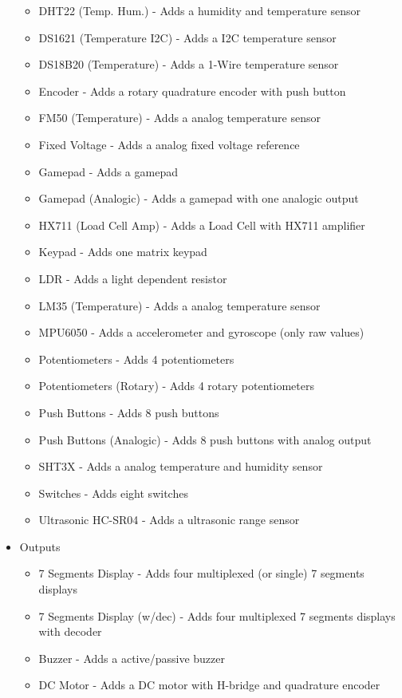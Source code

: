 \begin{itemize}
\begin{itemize}
  \item DHT22 (Temp. Hum.) - Adds a humidity and temperature sensor
  \item DS1621 (Temperature I2C) -  Adds a I2C temperature sensor 
  \item DS18B20 (Temperature) - Adds a 1-Wire temperature sensor 
  \item Encoder - Adds a rotary quadrature encoder with push button
  \item FM50 (Temperature) - Adds a analog temperature sensor
  \item Fixed Voltage -  Adds a analog fixed voltage reference
  \item Gamepad - Adds a gamepad
  \item Gamepad (Analogic) - Adds a gamepad with one analogic output 
  \item HX711 (Load Cell Amp) - Adds a Load Cell with HX711 amplifier  
  \item Keypad -  Adds one matrix keypad
  \item LDR - Adds a light dependent resistor 
  \item LM35 (Temperature) - Adds a analog temperature sensor
  \item MPU6050 - Adds a accelerometer and gyroscope (only raw values)
  \item Potentiometers - Adds 4 potentiometers
  \item Potentiometers (Rotary) - Adds 4 rotary potentiometers
  \item Push Buttons - Adds 8 push buttons
  \item Push Buttons (Analogic) - Adds 8 push buttons with analog output
  \item SHT3X - Adds a analog temperature and humidity sensor
  \item Switches - Adds eight switches
  \item Ultrasonic HC-SR04 - Adds a ultrasonic range sensor
\end{itemize}
 \item{Outputs}
  \begin{itemize}
   \item 7 Segments Display -  Adds four multiplexed (or single) 7 segments displays
   \item 7 Segments Display (w/dec) -  Adds four multiplexed 7 segments displays with decoder
   \item Buzzer - Adds a active/passive buzzer
   \item DC Motor - Adds a DC motor with H-bridge and quadrature encoder 

\end{itemize}
\end{itemize}
